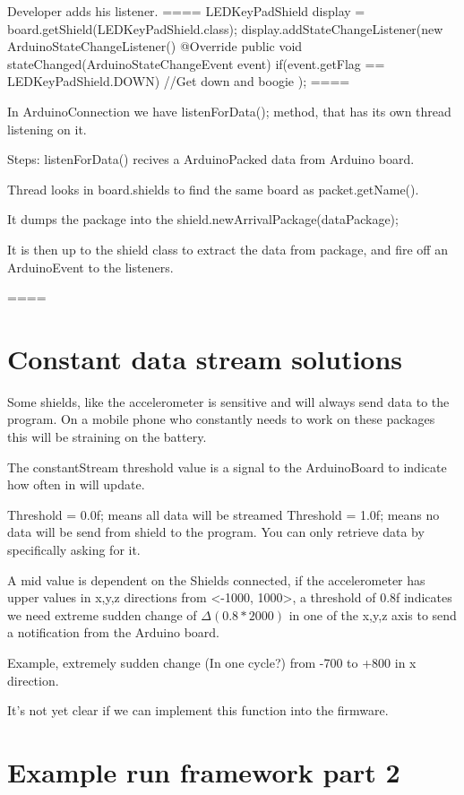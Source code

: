Developer adds his listener.
====
LEDKeyPadShield display = board.getShield(LEDKeyPadShield.class);
display.addStateChangeListener(new ArduinoStateChangeListener(){
  @Override
   public void stateChanged(ArduinoStateChangeEvent event) {
    if(event.getFlag == LEDKeyPadShield.DOWN){
        //Get down and boogie
    }
   }
});
====

In ArduinoConnection we have listenForData(); method, that has its own thread listening on it.

Steps:
listenForData() recives a ArduinoPacked data from Arduino board.

Thread looks in board.shields to find the same board as packet.getName().

It dumps the package into the shield.newArrivalPackage(dataPackage);

It is then up to the shield class to extract the data from package, and fire off an ArduinoEvent to the listeners.

====


\section{Constant data stream solutions}

Some shields, like the accelerometer is sensitive and will always send data to the program. On a mobile phone who constantly needs to work on these packages this will be straining on the battery.

The constantStream threshold value is a signal to the ArduinoBoard to indicate how often in will update.

Threshold = 0.0f; means all data will be streamed
Threshold = 1.0f; means no data will be send from shield to the program. You can only retrieve data by specifically asking for it.

A mid value is dependent on the Shields connected, if the accelerometer has upper values in x,y,z directions from <-1000, 1000>, a threshold of 0.8f indicates we need extreme sudden change of $\Delta(0.8*2000)$ in one of the x,y,z axis to send a notification from the Arduino board.

Example, extremely sudden change (In one cycle?) from -700 to +800 in x direction.  

It's not yet clear if we can implement this function into the firmware.

\section{Example run framework part 2}

